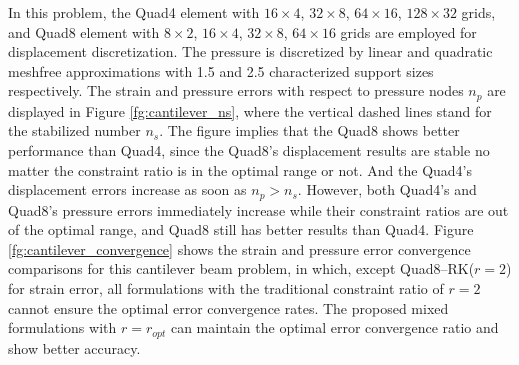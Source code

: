In this problem, the Quad4 element with $16\times 4$, $32\times 8$, $64\times 16$, $128\times 32$ grids, and Quad8 element with $8\times 2$, $16\times 4$, $32\times 8$, $64\times 16$ grids are employed for displacement discretization. The pressure is discretized by linear and quadratic meshfree approximations with 1.5 and 2.5 characterized support sizes respectively. The strain and pressure errors with respect to pressure nodes $n_p$ are displayed in Figure \ref{fg:cantilever_ns}, where the vertical dashed lines stand for the stabilized number $n_s$. The figure implies that the Quad8 shows better performance than Quad4, since the Quad8's displacement results are stable no matter the constraint ratio is in the optimal range or not. And the Quad4's displacement errors increase as soon as $n_p > n_s$. However, both Quad4's and Quad8's pressure errors immediately increase while their constraint ratios are out of the optimal range, and Quad8 still has better results than Quad4. Figure \ref{fg:cantilever_convergence} shows the strain and pressure error convergence comparisons for this cantilever beam problem, in which, except Quad8--RK($r=2$) for strain error, all formulations with the traditional constraint ratio of $r=2$ cannot ensure the optimal error convergence rates. The proposed mixed formulations with $r=r_{opt}$ can maintain the optimal error convergence ratio and show better accuracy.

